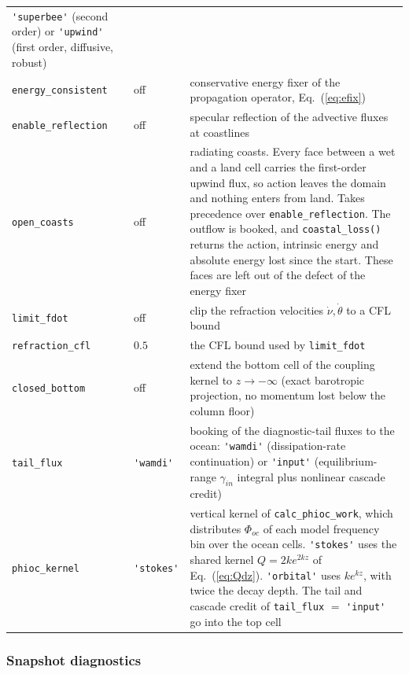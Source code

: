 \documentclass[12pt]{article}
\newcommand{\eq }  [1]{Eq.~(\ref{#1})}  %
\begin{document}
\begin{longtable}{@{}llp{8.2cm}@{}}
  \verb|'superbee'| (second order) or \verb|'upwind'| (first order,
  diffusive, robust) \\
\verb|energy_consistent| & off & conservative energy fixer of the propagation
  operator, \eq{eq:efix} \\
\verb|enable_reflection| & off & specular reflection of the advective fluxes
  at coastlines \\
\verb|open_coasts| & off & radiating coasts. Every face between a wet and a
  land cell carries the first-order upwind flux, so action leaves the domain
  and nothing enters from land. Takes precedence over
  \verb|enable_reflection|. The outflow is booked, and \verb|coastal_loss()|
  returns the action, intrinsic energy and absolute energy lost since the
  start. These faces are left out of the defect of the energy fixer \\
\verb|limit_fdot| & off & clip the refraction velocities $\dot\nu, \dot\theta$
  to a CFL bound \\
\verb|refraction_cfl| & $0.5$ & the CFL bound used by \verb|limit_fdot| \\
\verb|closed_bottom| & off & extend the bottom cell of the coupling kernel to
  $z \to -\infty$ (exact barotropic projection, no momentum lost below the
  column floor) \\
\verb|tail_flux| & \verb|'wamdi'| & booking of the diagnostic-tail fluxes to
  the ocean: \verb|'wamdi'| (dissipation-rate continuation) or
  \verb|'input'| (equilibrium-range $\gamma_{in}$ integral plus nonlinear
  cascade credit) \\
\verb|phioc_kernel| & \verb|'stokes'| & vertical kernel of
  \verb|calc_phioc_work|, which distributes $\Phi_{oc}$ of each model
  frequency bin over the ocean cells. \verb|'stokes'| uses the shared kernel
  $Q = 2k e^{2kz}$ of \eq{eq:Qdz}. \verb|'orbital'| uses $k e^{kz}$, with
  twice the decay depth. The tail and cascade credit of \verb|tail_flux|
  $=$ \verb|'input'| go into the top cell \\
\hline
\end{longtable}

\subsubsection*{Snapshot diagnostics}
\end{document}
